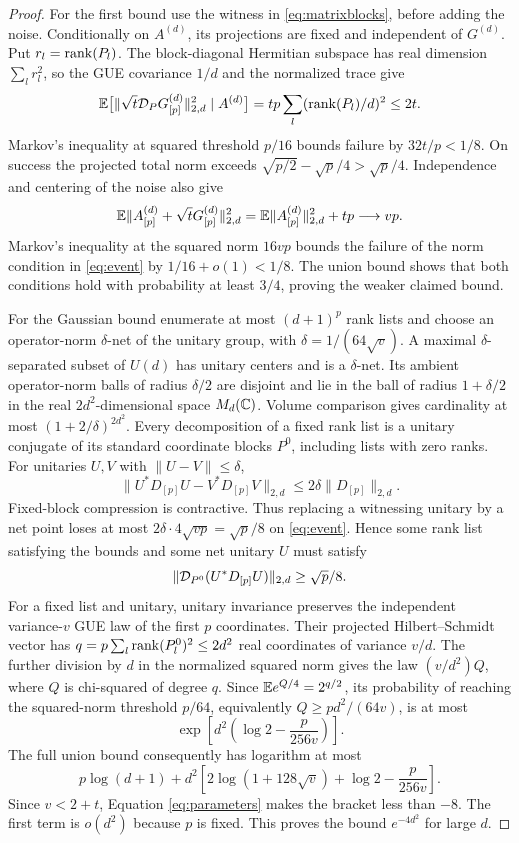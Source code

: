 \begin{proof}
For the first bound use the witness in \eqref{eq:matrixblocks}, before
adding the noise. Conditionally on $A^{(d)}$, its projections are fixed
and independent of $G^{(d)}$. Put $r_l=\operatorname{rank}(P_l)$. The block-diagonal
Hermitian subspace has real dimension $\sum_l r_l^2$, so the GUE
covariance $1/d$ and the normalized trace give
\[
 \mathbb E\big[\|\sqrt t\mathcal D_P G^{(d)}_{[p]}\|_{2,d}^2\mid A^{(d)}\big]
 =tp\sum_l(\operatorname{rank}(P_l)/d)^2\leq2t.
\]
Markov's inequality at squared threshold $p/16$ bounds failure by
$32t/p<1/8$. On success the projected total norm exceeds
$\sqrt{p/2}-\sqrt p/4>\sqrt p/4$.
Independence and centering of the noise also give
\[
 \mathbb E\|A^{(d)}_{[p]}+\sqrt t G^{(d)}_{[p]}\|_{2,d}^2
 =\mathbb E\|A^{(d)}_{[p]}\|_{2,d}^2+tp\longrightarrow vp.
\]
Markov's inequality at the squared norm $16vp$ bounds the failure of
the norm condition in \eqref{eq:event} by $1/16+o(1)<1/8$.
The union bound shows that both conditions hold with probability at
least $3/4$, proving the weaker claimed bound.

For the Gaussian bound enumerate at most $(d+1)^p$ rank lists and choose
an operator-norm $\delta$-net of the unitary group, with
$\delta=1/(64\sqrt v)$. A maximal $\delta$-separated subset of $U(d)$
has unitary centers and is a $\delta$-net. Its ambient operator-norm
balls of radius $\delta/2$ are disjoint and lie in the ball of radius
$1+\delta/2$ in the real $2d^2$-dimensional space $M_d(\mathbb C)$. Volume
comparison gives cardinality at most $(1+2/\delta)^{2d^2}$.
Every decomposition of a fixed rank list is a unitary conjugate of
its standard coordinate blocks $P^0$, including lists with zero ranks.
For unitaries $U,V$ with $\|U-V\|\leq\delta$,
\[
 \|U^*D_{[p]}U-V^*D_{[p]}V\|_{2,d}
 \leq2\delta\|D_{[p]}\|_{2,d}.
\]
Fixed-block compression is contractive. Thus replacing a witnessing
unitary by a net point loses at most
$2\delta\cdot4\sqrt{vp}=\sqrt p/8$ on \eqref{eq:event}.
Hence some rank list satisfying the bounds and some net unitary $U$
must satisfy
\[
 \|\mathcal D_{P^0}(U^*D_{[p]}U)\|_{2,d}\geq\sqrt p/8.
\]
For a fixed list and unitary, unitary invariance preserves the independent
variance-$v$ GUE law of the first $p$ coordinates. Their projected
Hilbert--Schmidt vector has
$q=p\sum_l\operatorname{rank}(P_l^0)^2\leq2d^2$ real coordinates of variance $v/d$.
The further division by $d$ in the normalized squared norm gives the
law $(v/d^2)Q$, where $Q$ is chi-squared of degree $q$.
Since $\mathbb E e^{Q/4}=2^{q/2}$, its probability of reaching the squared-norm
threshold $p/64$, equivalently $Q\geq pd^2/(64v)$, is at most
\[
 \exp\left[d^2\left(\log2-\frac{p}{256v}\right)\right].
\]
The full union bound consequently has logarithm at most
\[
 p\log(d+1)+d^2\left[2\log(1+128\sqrt v)+\log2-\frac{p}{256v}\right].
\]
Since $v<2+t$, Equation \eqref{eq:parameters} makes the bracket less
than $-8$. The first term is $o(d^2)$ because $p$ is fixed. This proves
the bound $e^{-4d^2}$ for large $d$.
\end{proof}

